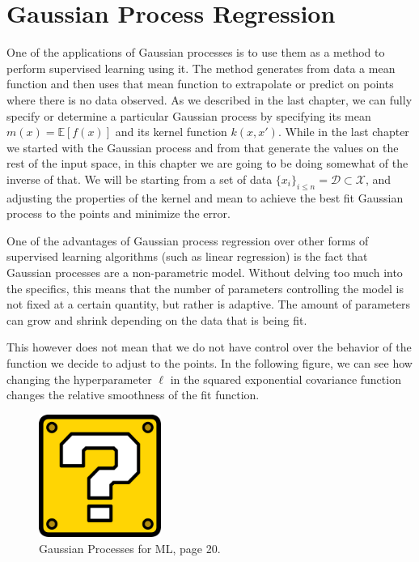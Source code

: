 \section{Gaussian Process Regression}

One of the applications of Gaussian processes is to use them as a method to perform supervised learning using it. The method generates from data a mean function and then uses that mean function to extrapolate or predict on points where there is no data observed. As we described in the last chapter, we can fully specify or determine a particular Gaussian process by specifying its mean $m(x) = \mathbb{E}[f(x)]$ and its kernel function $k(x,x')$. While in the last chapter we started with the Gaussian process and from that generate the values on the rest of the input space, in this chapter we are going to be doing somewhat of the inverse of that. We will be starting from a set of data $\{ x_i \}_{i \leq n} = \mathcal{D} \subset \mathcal{X}$, and adjusting the properties of the kernel and mean to achieve the best fit Gaussian process to the points and minimize the error. 

One of the advantages of Gaussian process regression over other forms of supervised learning algorithms (such as linear regression) is the fact that Gaussian processes are a non-parametric model. Without delving too much into the specifics, this means that the number of parameters controlling the model is not fixed at a certain quantity, but rather is adaptive. The amount of parameters can grow and shrink depending on the data that is being fit. 

This however does not mean that we do not have control over the behavior of the function we decide to adjust to the points. In the following figure, we can see how changing the hyperparameter $\ell$ in the squared exponential covariance function changes the relative smoothness of the fit function. 

\begin{figure}[h]
	\includegraphics[width=4cm]{Figures/missing.png}
	\centering
	\caption{Gaussian Processes for ML, page 20.}
	\label{trajectories}
\end{figure}

